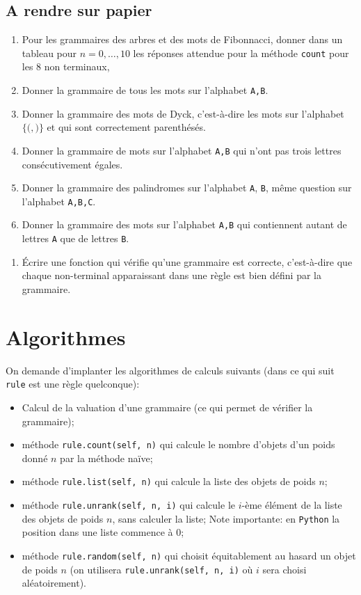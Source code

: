 \documentclass[11pt]{article}
\newcounter{asuivre}
\newenvironment{ask}{\begin{enumerate}}%
                       {\setcounter{asuivre}{\theenumi}\end{enumerate}}
\newenvironment{asks}{\begin{enumerate}\setcounter{enumi}{\theasuivre}}%
                       {\setcounter{asuivre}{\theenumi}\end{enumerate}}
\newcommand{\Python}{\texttt{Python}}
\begin{document}
\subsection{A rendre sur papier}

\begin{ask}
\item Pour les grammaires des arbres et des mots de Fibonnacci, donner dans un
  tableau pour $n=0,\dots,10$ les réponses attendue pour la méthode
  \texttt{count} pour les $8$ non terminaux,
\item Donner la grammaire de tous les mots sur l'alphabet \texttt{A,B}.
\item Donner la grammaire des mots de Dyck, c'est-à-dire les mots sur
  l'alphabet $\{\texttt{(}, \texttt{)}\}$ et qui sont correctement
  parenthésés.
\item Donner la grammaire de mots sur l'alphabet \texttt{A,B} qui n'ont pas
  trois lettres consécutivement égales.
\item Donner la grammaire des palindromes sur l'alphabet \texttt{A},
  \texttt{B}, même question sur l'alphabet \texttt{A,B,C}.
\item Donner la grammaire des mots sur l'alphabet \texttt{A,B} qui
  contiennent autant de lettres \texttt{A} que de lettres \texttt{B}.
\end{ask}

\begin{asks}
\item Écrire une fonction qui vérifie qu'une grammaire est correcte,
  c'est-à-dire que chaque non-terminal apparaissant dans une règle est bien
  défini par la grammaire.
\end{asks}



\section{Algorithmes}

On demande d'implanter les algorithmes de calculs suivants (dans ce qui suit
\texttt{rule} est une règle quelconque):
\begin{itemize}
\item Calcul de la valuation d'une grammaire (ce qui permet de vérifier la
  grammaire);
\item méthode \verb+rule.count(self, n)+ qui calcule le nombre d'objets d'un
  poids donné $n$ par la méthode naïve;
\item méthode \verb+rule.list(self, n)+ qui calcule la liste des objets de poids
  $n$;
\item méthode \verb+rule.unrank(self, n, i)+ qui calcule le $i$-ème élément de
  la liste des objets de poids $n$, sans calculer la liste; Note importante:
  en \Python{} la position dans une liste commence à $0$;
\item méthode \verb+rule.random(self, n)+ qui choisit équitablement au hasard
  un objet de poids $n$ (on utilisera \verb+rule.unrank(self, n, i)+ où $i$
  sera choisi aléatoirement).
\end{itemize}
\end{document}
